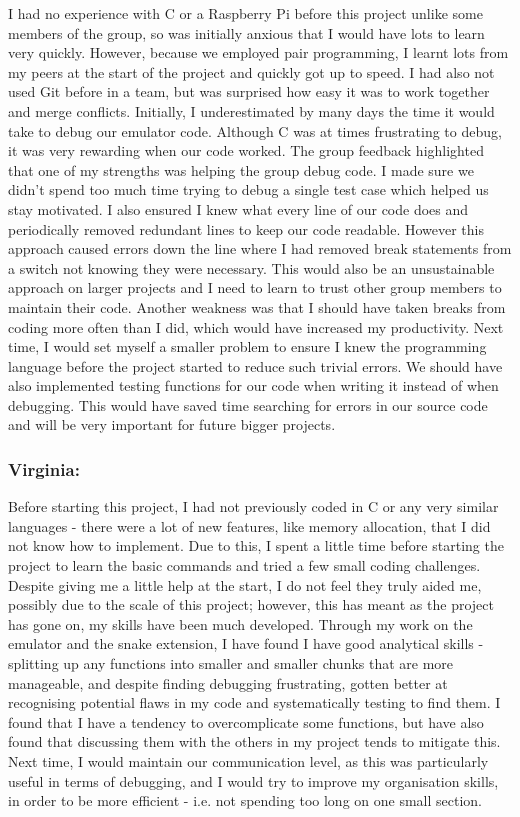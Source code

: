 \documentclass[11pt]{article}
\begin{document}
{I had no experience with C or a Raspberry Pi before this project unlike
some members of the group, so was initially anxious that I would have
lots to learn very quickly. However, because we employed pair
programming, I learnt lots from my peers at the start of the project and
quickly got up to speed. I had also not used Git before in a team, but
was surprised how easy it was to work together and merge conflicts.
Initially, I underestimated by many days the time it would take to debug
our emulator code. Although C was at times frustrating to debug, it was
very rewarding when our code worked. The group feedback highlighted that
one of my strengths was helping the group debug code. I made sure we
didn't spend too much time trying to debug a single test case which
helped us stay motivated. I also ensured I knew what every line of our
code does and periodically removed redundant lines to keep our code
readable. However this approach caused errors down the line where I had
removed break statements from a switch not knowing they were necessary.
This would also be an unsustainable approach on larger projects and I
need to learn to trust other group members to maintain their code.
Another weakness was that I should have taken breaks from coding more
often than I did, which would have increased my productivity. Next time,
I would set myself a smaller problem to ensure I knew the programming
language before the project started to reduce such trivial errors. We
should have also implemented testing functions for our code when writing
it instead of when debugging. This would have saved time searching for
errors in our source code and will be very important for future bigger
projects.}

\hypertarget{h.vo7j1qawt1os}{%
\subsubsection{\texorpdfstring{{Virginia:}}{Virginia:}}\label{h.vo7j1qawt1os}}

{Before starting this project, I had not previously coded in C or any
very similar languages - there were a lot of new features, like memory
allocation, that I did not know how to implement. Due to this, I spent a
little time before starting the project to learn the basic commands and
tried a few small coding challenges. Despite giving me a little help at
the start, I do not feel they truly aided me, possibly due to the scale
of this project; however, this has meant as the project has gone on, my
skills have been much developed. Through my work on the emulator and the
snake extension, I have found I have good analytical skills - splitting
up any functions into smaller and smaller chunks that are more
manageable, and despite finding debugging frustrating, gotten better at
recognising potential flaws in my code and systematically testing to
find them. I found that I have a tendency to overcomplicate some
functions, but have also found that discussing them with the others in
my project tends to mitigate this. Next time, I would maintain our
communication level, as this was particularly useful in terms of
debugging, and I would try to improve my organisation skills, in order
to be more efficient - i.e. not spending too long on one small section.}
\end{document}
